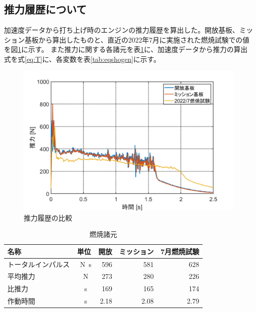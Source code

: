 \documentclass[a4paper,11pt,uplatex]{jsarticle}
\begin{document}
\subsection{推力履歴について}
\label{suiryokurireki}
加速度データから打ち上げ時のエンジンの推力履歴を算出した。開放基板、ミッション基板から算出したものと、直近の2022年7月に実施された燃焼試験での値を図\ref{fig:suiryokurireki}に示す。
また推力に関する各諸元を表\ref{tab:nenshoushogen}に、加速度データから推力の算出式を式\eqref{eq:T}に、各変数を表\ref{tab:eqshogen}に示す。

\begin{figure}[H]
	\centering
	\includegraphics[width=0.7\linewidth]{pic_sim/acc_thrust.png}
	\caption{推力履歴の比較}
	\label{fig:suiryokurireki}
\end{figure}

\begin{table}[H]
	\centering
	\caption{燃焼諸元}
	\label{tab:nenshoushogen}
	\begin{tabular}{lcrrr}
		\toprule
		名称        & 単位         & \multicolumn{1}{c}{開放} & \multicolumn{1}{c}{ミッション} & \multicolumn{1}{c}{7月燃焼試験} \\
		\midrule
		トータルインパルス & \SI{}{N.s} & 596                    & 581                       & 628                        \\
		平均推力      & \SI{}{N}   & 273                    & 280                       & 226                        \\
		比推力       & \SI{}{s}   & 169                    & 165                       & 174                        \\
		作動時間      & \SI{}{s}   & 2.18                   & 2.08                      & 2.79                       \\
		\bottomrule
	\end{tabular}
\end{table}
\end{document}

